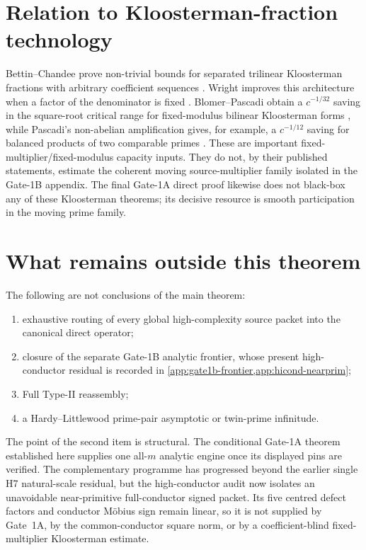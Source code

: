 \documentclass[11pt]{article}
\theoremstyle{definition}
\newcommand{\1}{\mathbf 1}
\begin{document}
\section{Relation to Kloosterman-fraction technology}
Bettin--Chandee prove non-trivial bounds for separated trilinear Kloosterman
fractions with arbitrary coefficient sequences \cite{BettinChandee2015}.
Wright improves this architecture when a factor of the denominator is fixed
\cite{Wright2026}.  Blomer--Pascadi obtain a $c^{-1/32}$ saving in the
square-root critical range for fixed-modulus bilinear Kloosterman forms
\cite{BlomerPascadi2026}, while Pascadi's non-abelian amplification gives, for
example, a $c^{-1/12}$ saving for balanced products of two comparable primes
\cite{Pascadi2025}.  These are important fixed-multiplier/fixed-modulus
capacity inputs.  They do not, by their published statements, estimate the
coherent moving source-multiplier family isolated in the Gate-1B appendix.
The final Gate-1A direct proof likewise does not black-box any of these
Kloosterman theorems; its decisive resource is smooth participation in the
moving prime family.

\section{What remains outside this theorem}
The following are not conclusions of the main theorem:
\begin{enumerate}
  \item exhaustive routing of every global high-complexity source packet into
        the canonical direct operator;
  \item closure of the separate Gate-1B analytic frontier, whose present
        high-conductor residual is recorded in \cref{app:gate1b-frontier,app:hicond-nearprim};
  \item Full Type-II reassembly;
  \item a Hardy--Littlewood prime-pair asymptotic or twin-prime infinitude.
\end{enumerate}

The point of the second item is structural.  The conditional Gate-1A theorem
established here supplies one all-$m$ analytic engine once its displayed pins
are verified.  The complementary programme has progressed beyond the earlier
single H7 natural-scale residual, but the high-conductor audit now isolates an
unavoidable near-primitive full-conductor signed packet.  Its five centred
defect factors and conductor M\"obius sign remain linear, so it is not supplied
by Gate~1A, by the common-conductor square norm, or by a coefficient-blind
fixed-multiplier Kloosterman estimate.
\end{document}
